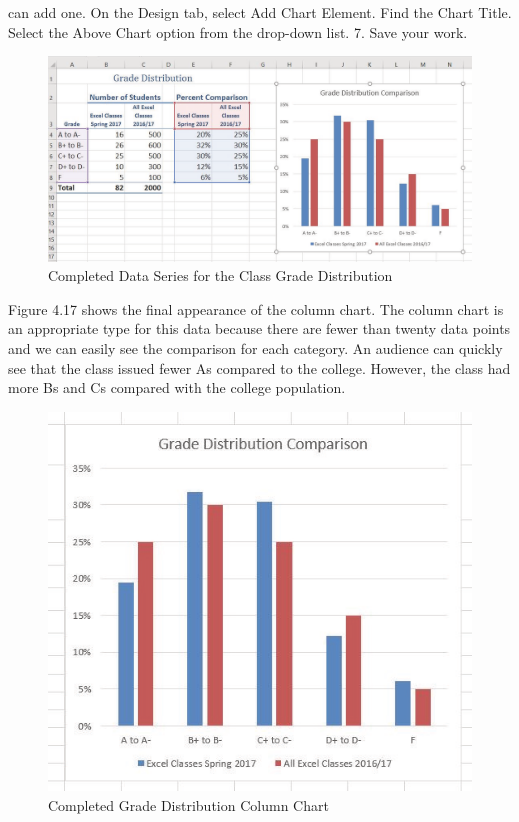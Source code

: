 can add one. On the Design tab, select Add Chart Element. Find the Chart Title. Select the
Above Chart option from the drop-down list.
7. Save your work.


\begin{figure}[H]
	\centering
	\includegraphics[width=\maxwidth{.95\linewidth}]{gfx/ch04_fig19}
	\caption{Completed Data Series for the Class Grade Distribution}
	\label{04:fig19}
\end{figure}





Figure 4.17 shows the final appearance of the column chart. The column chart is an appropriate type
for this data because there are fewer than twenty data points and we can easily see the comparison
for each category. An audience can quickly see that the class issued fewer As compared to the college.
However, the class had more Bs and Cs compared with the college population.


\begin{figure}[H]
	\centering
	\includegraphics[width=\maxwidth{.95\linewidth}]{gfx/ch04_fig20}
	\caption{Completed Grade Distribution Column Chart}
	\label{04:fig20}
\end{figure}




